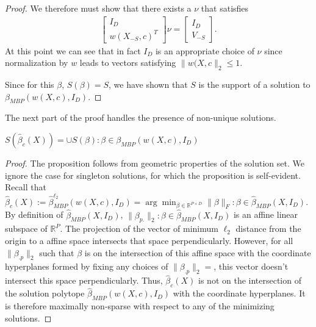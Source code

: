 \begin{proof}
We therefore must show that there exists a $\nu$ that satisfies
\begin{align}
\begin{bmatrix}
I_D \\
w(X_{-S},c)^T
\end{bmatrix}\nu  = \begin{bmatrix}
I_D \\
V_{-S}
\end{bmatrix}.
\end{align}
At this point we can see that in fact $I_D$ is an appropriate choice of $\nu$ since normalization by $w$ leads to vectors satisfying $\|w(X,c\|_2 \leq 1$.

Since for this $\beta$, $S(\beta) = S$, we have shown that $S$ is the support of a solution to $\beta_{MBP} (w(X,c), I_D)$.
\end{proof}

The next part of the proof handles the presence of non-unique solutions.

\begin{proposition}
\label{prop:support_containment}
$S(\widehat \beta_c ( X)) = \cup S(\beta): \beta \in  \mathcal \beta_{MBP} (w(X,c), I_D)$
 \end{proposition}

\begin{proof}
The proposition follows from geometric properties of the solution set.
We ignore the case for singleton solutions, for which the proposition is self-evident.
Recall that $\widehat \beta_c ( X) := \widehat \beta_{MBP}^{\ell_2} ( w(X,c), I_D ) =  \arg \min_{\beta \in \mathbb R^{P \times D} } \|\beta\|_F : \beta \in \widehat {\mathcal \beta}_{MBP}(X, I_D)  $.
By definition of $\widehat {\mathcal \beta}_{MBP} (X, I_D) $, $\|\beta_{p.} \|_2 : \beta \in  \widehat { \mathcal \beta}_{MBP} (X, I_D) $ is an affine linear subspace of $\mathbb R^{P}.$
The projection of the vector of minimum $\ell_2$ distance from the origin to a affine space intersects that space perpendicularly.
However, for all $\|\beta_{.p}\|_2$ such that $\beta$ is on the intersection of this affine space with the coordinate hyperplanes formed by fixing any choices of $\|\beta_{.p}\|_2 = $, this vector doesn't intersect this space perpendicularly.
Thus, $\widehat \beta_c ( X)$ is not on the intersection of the solution polytope $ \widehat {\mathcal \beta}_{MBP} (w(X,c), I_D)$ with the coordinate hyperplanes.
It is therefore maximally non-sparse with respect to any of the minimizing solutions.
\end{proof}

